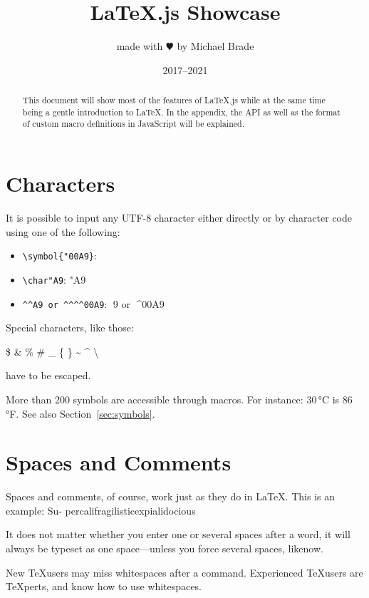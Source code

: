 \documentclass{article}
\title{\LaTeX.js Showcase}
\author{made with $\varheartsuit$ by Michael Brade}
\date{2017--2021}
\begin{document}
\maketitle

\begin{abstract}
This document will show most of the features of \LaTeX.js while at the same time being a
gentle introduction to \LaTeX. In the appendix, the API as well as the format of custom macro definitions
in JavaScript will be explained.
\end{abstract}

\section{Characters}

It is possible to input any UTF-8 character either directly or by character code using one
of the following:

\begin{itemize}
  \item \texttt{\textbackslash symbol\{"00A9\}}: 
  \item \verb|\char"A9|: \char"A9
  \item \verb|^^A9 or ^^^^00A9|: ^^A9 or ^^^^00A9
\end{itemize}

\bigskip
\noindent
Special characters, like those:

\begin{center}
\$ \& \% \# \_ \{ \} \~{} \^{} \textbackslash
\end{center}

have to be escaped.

More than 200 symbols are accessible through macros. For instance: 30\,°C is 86\,°F.
See also Section~\ref{sec:symbols}.

\section{Spaces and Comments}

Spaces and comments, of course, work just as they do in \LaTeX. This is an example: Su-
percalifragilisticexpialidocious

It does not matter whether you enter one or several spaces after a word, it will always
be typeset as one space—unless you force several spaces, like\quad now.

New \TeX users may miss whitespaces after a command. Experienced \TeX users are
\TeX{}perts, and know how to use whitespaces.
\end{document}
